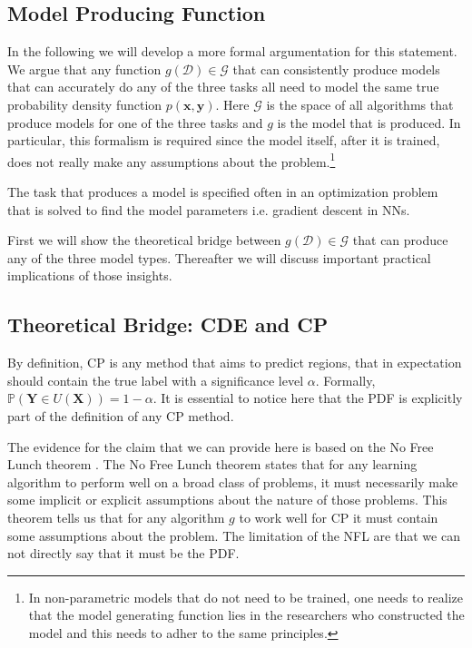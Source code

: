 \subsection{Model Producing Function}

In the following we will develop a more formal argumentation for this statement. We argue that any function $g(\mathcal{D}) \in \mathcal{G}$ that can consistently produce models that can accurately do any of the three tasks all need to model the same true probability density function $p(\mathbf{x}, \mathbf{y})$. Here $\mathcal{G}$ is the space of all algorithms that produce models for one of the three tasks and $g$ is the model that is produced. In particular, this formalism is required since the model itself, after it is trained, does not really make any assumptions about the problem.\footnote{In non-parametric models that do not need to be trained, one needs to realize that the model generating function lies in the researchers who constructed the model and this needs to adher to the same principles.}

The task that produces a model is specified often in an optimization problem that is solved to find the model parameters i.e. gradient descent in NNs.%

First we will show the theoretical bridge between $g(\mathcal{D}) \in \mathcal{G}$ that can produce any of the three model types. Thereafter we will discuss important practical implications of those insights.

\subsection{Theoretical Bridge: CDE and CP} \label{sec:bridge_cde_cp}

By definition, CP is any method that aims to predict regions, that in expectation should contain the true label with a significance level $\alpha$. Formally,  $\mathbb{P}(\mathbf{Y} \in U(\mathbf{X})) = 1 - \alpha$. It is essential to notice here that the PDF is explicitly part of the definition of any CP method.

The evidence for the claim that we can provide here is based on the No Free Lunch theorem \cite{wolpert1997no}. The No Free Lunch theorem states that for any learning algorithm to perform well on a broad class of problems, it must necessarily make some implicit or explicit assumptions about the nature of those problems. This theorem tells us that for any algorithm $g$ to work well for CP it must contain some assumptions about the problem. The limitation of the NFL are that we can not directly say that it must be the PDF.

